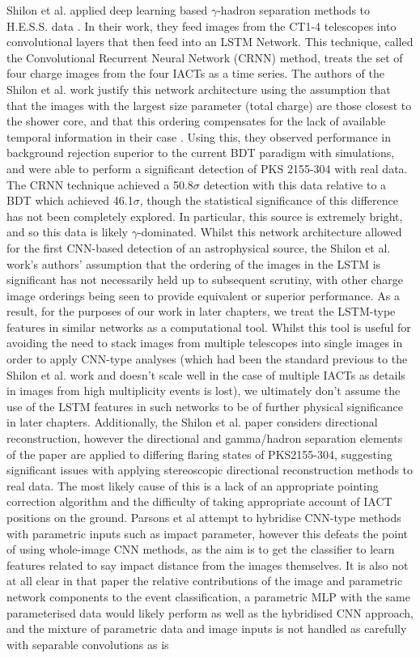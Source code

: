 Shilon et al. \cite{Shilon} applied deep learning based $\gamma$-hadron separation methods to H.E.S.S. data . In their work, they feed images from the CT1-4 telescopes into convolutional layers that then feed into an LSTM Network. This technique, called the Convolutional Recurrent Neural Network (CRNN) method, treats the set of four charge images from the four IACTs as a time series. The authors of the Shilon et al. work justify this network architecture using the assumption that that the images with the largest size parameter (total charge) are those closest to the shower core, and that this ordering compensates for the lack of available temporal information in their case \cite{Shilon}. Using this, they observed performance in background rejection superior to the current BDT paradigm with simulations, and were able to perform a significant detection of PKS 2155-304 with real data. The CRNN technique achieved a 50.8$\sigma$ detection with this data relative to a BDT which achieved 46.1$\sigma$, though the statistical significance of this difference has not been completely explored. In particular, this source is extremely bright, and so this data is likely $\gamma$-dominated. Whilst this network architecture allowed for the first CNN-based detection of an astrophysical source, the Shilon et al. work's authors' assumption that the ordering of the images in the LSTM is significant has not necessarily held up to subsequent scrutiny, with other charge image orderings \cite{ariconf} being seen to provide equivalent or superior performance. As a result, for the purposes of our work in later chapters, we treat the LSTM-type features in similar networks as a computational tool. Whilst this tool is useful for avoiding the need to stack images from multiple telescopes into single images in order to apply CNN-type analyses (which had been the standard previous to the Shilon et al. work and doesn't scale well in the case of multiple IACTs \cite{Shilon}\cite{salvatore} as details in images from high multiplicity events is lost), we ultimately don't assume the use of the LSTM features in such networks to be of further physical significance in later chapters. Additionally, the Shilon et al. paper considers directional reconstruction, however the directional and gamma/hadron separation elements of the paper are applied to differing flaring states of PKS2155-304, suggesting significant issues with applying stereoscopic directional reconstruction methods to real data. The most likely cause of this is a lack of an appropriate pointing correction algorithm and the difficulty of taking appropriate account of IACT positions on the ground. Parsons et al \cite{ParsonsOhm} attempt to hybridise CNN-type methods with parametric inputs such as impact parameter, however this defeats the point of using whole-image CNN methods, as the aim is to get the classifier to learn features related to say impact distance from the images themselves. It is also not at all clear in that paper the relative contributions of the image and parametric network components to the event classification, a parametric MLP with the same parameterised data would likely perform as well as the hybridised CNN approach, and the mixture of parametric data and image inputs is not handled as carefully with separable convolutions as is 